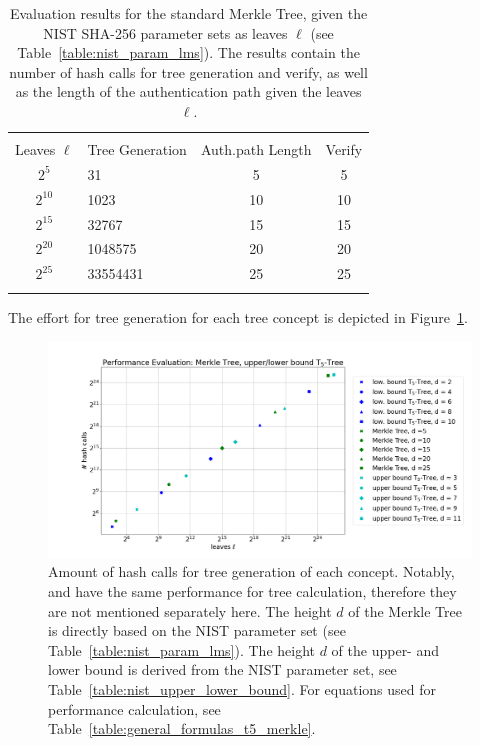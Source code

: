 \begin{table}
\centering
\begin{tabular}{c l c c} 
 \hline\noalign{\smallskip}
 \multicolumn{4}{c}{\textbf{Evaluation Results NIST: Merkle Tree}} \\
 \noalign{\smallskip} 
  Leaves $\ell$ & Tree Generation & Auth.path Length & Verify \\
 \hline\noalign{\smallskip}
 $2^5$ & 31 & 5 & 5 \\
 $2^{10}$ & 1023 & 10 & 10 \\
 $2^{15}$ & 32767 & 15 & 15 \\ 
 $2^{20}$ & 1048575 & 20 & 20 \\ 
 $2^{25}$ & 33554431 & 25 & 25 \\ 
 \hline\noalign{\smallskip}
 \end{tabular}
\caption{Evaluation results for the standard Merkle Tree, given the NIST SHA-256 parameter sets as leaves $\ell$ (see Table~\ref{table:nist_param_lms}). The results contain the number of hash calls for tree generation and verify, as well as the length of the authentication path given the leaves $\ell$.}
\label{table:eval_merkle_tree_NIST}
\end{table}

The effort for tree generation for each tree concept is depicted in Figure~\ref{img:performance_tree_gen}.

\begin{figure}
\centering
\includegraphics[width=\linewidth]{images/Evaluation/performance_tree_generation.png}
\caption{Amount of hash calls for tree generation of each concept. Notably, \tftree and \extree have the same performance for tree calculation, therefore they are not mentioned separately here. The height $d$ of the Merkle Tree is directly based on the NIST parameter set (see Table~\ref{table:nist_param_lms}). The height $d$ of the upper- and lower bound \tftree is derived from the NIST parameter set, see Table~\ref{table:nist_upper_lower_bound}. For equations used for performance calculation, see Table~\ref{table:general_formulas_t5_merkle}.}
\label{img:performance_tree_gen}
\end{figure}

